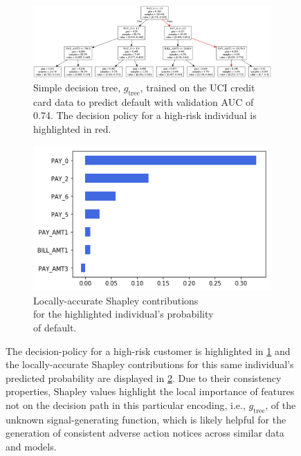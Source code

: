 \documentclass{article}
\begin{document}
\begin{figure}[ht!]
	\begin{subfigure}{.6\textwidth}
		\includegraphics[height=.45\linewidth, width=1.15\linewidth]{img/dt.png}
  		\caption{Simple decision tree, $g_{\text{tree}}$, trained on the UCI credit card data to predict default with validation AUC of 0.74. The decision policy for a high-risk individual is highlighted in red.}
  		\label{fig:dt}
	\end{subfigure}\hspace{50pt}
	\begin{subfigure}{.4\textwidth}
		\vspace{30pt}
  		\includegraphics[height=.5\linewidth, width=.8\linewidth]{img/shap.png}
  		\vspace{5pt}
  		\caption{Locally-accurate Shapley contributions\\ for the highlighted individual's probability\\ of default.}
  		\label{fig:shap}
	\end{subfigure}
	\caption{The decision-policy for a high-risk customer is highlighted in \ref{fig:dt} and the locally-accurate Shapley contributions for this same individual's predicted probability are displayed in \ref{fig:shap}. Due to their consistency properties, Shapley values highlight the local importance of features not on the decision path in this particular encoding, i.e., $g_{\text{tree}}$, of the unknown signal-generating function, which is likely helpful for the generation of consistent adverse action notices across similar data and models.}
	\label{fig:dt_shap}
\end{figure}
\end{document}
